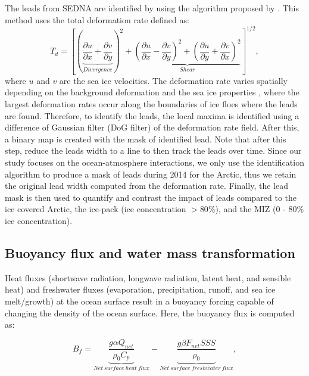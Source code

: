 The leads from SEDNA are identified by using the algorithm proposed by \citet{Hutter_identification_2019}. This method uses the total deformation rate defined as: 
\begin{equation}
    T_d = \left[\left(\underbrace{\frac{\partial u}{\partial x} +\frac{\partial v}{\partial y}}_{Divergence}\right)^2 + \underbrace{\left(\frac{\partial u}{\partial x} - \frac{\partial v}{\partial y}\right)^2+ \left(\frac{\partial u}{\partial y} + \frac{\partial v}{\partial x}\right)^2}_{Shear}\right]^{1/2},
\end{equation}
where $u$ and $v$ are the sea ice velocities. The deformation rate varies spatially depending on the background deformation and the sea ice properties \citep{Reiser_LKF_2020}, where the largest deformation rates occur along the boundaries of ice floes where the leads are found. Therefore, to identify the leads, the local maxima is identified using a difference of Gaussian filter (DoG filter) of the deformation rate field. After this, a binary map is created with the mask of identified lead. Note that after this step, \citet{Hutter_identification_2019} reduce the leads width to a line to then track the leads over time. Since our study focuses on the ocean-atmosphere interactions, we only use the identification algorithm to produce a mask of leads during 2014 for the Arctic, thus we retain the original lead width computed from the deformation rate. Finally, the lead mask is then used to quantify and contrast the impact of leads compared to the ice covered Arctic, the ice-pack (ice concentration $> 80\%$), and the MIZ (0 - 80\% ice concentration).

\subsection*{Buoyancy flux and water mass transformation}
 
Heat fluxes (shortwave radiation, longwave radiation, latent heat, and sensible heat) and freshwater fluxes (evaporation, precipitation, runoff, and sea ice melt/growth) at the ocean surface result in a buoyancy forcing capable of changing the density of the ocean surface. Here, the buoyancy flux is computed as:

\begin{equation}
    B_f = \underbrace{\frac{g \alpha Q_{net}}{\rho_0 C_p}}_{Net\ surface\ heat\ flux} - \underbrace{\frac{g \beta F_{net} SSS }{\rho_0}}_{Net\ surface\ freshwater\ flux},
\end{equation}

